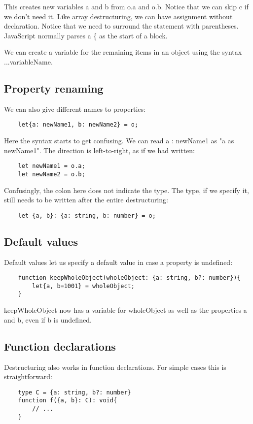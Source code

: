 This creates new variables a and b from o.a and o.b. Notice that we can skip c if we don't need it. Like array destructuring, we can have assignment without declaration. Notice that we need to surround the statement with parentheses. JavaScript normally parses a \{ as the start of a block.

We can create a variable for the remaining items in an object using the syntax ...variableName.

\subsection{Property renaming}
We can also give different names to properties:
\begin{lstlisting}
    let{a: newName1, b: newName2} = o;
\end{lstlisting}

Here the syntax starts to get confusing. We can read a : newName1 as "a as newName1". The direction is left-to-right, as if we had written:
\begin{lstlisting}
    let newName1 = o.a;
    let newName2 = o.b;
\end{lstlisting}

Confusingly, the colon here does not indicate the type. The type, if we specify it, still needs to be written after the entire destructuring:
\begin{lstlisting}
    let {a, b}: {a: string, b: number} = o;
\end{lstlisting}

\subsection{Default values}
Default values let us specify a default value in case a property is undefined:
\begin{lstlisting}
    function keepWholeObject(wholeObject: {a: string, b?: number}){
        let{a, b=1001} = wholeObject;
    }
\end{lstlisting}

keepWholeObject now has a variable for wholeObject as well as the properties a and b, even if b is undefined.

\subsection{Function declarations}
Destructuring also works in function declarations. For simple cases this is straightforward:
\begin{lstlisting}
    type C = {a: string, b?: number}
    function f({a, b}: C): void{
        // ...
    }
\end{lstlisting}

